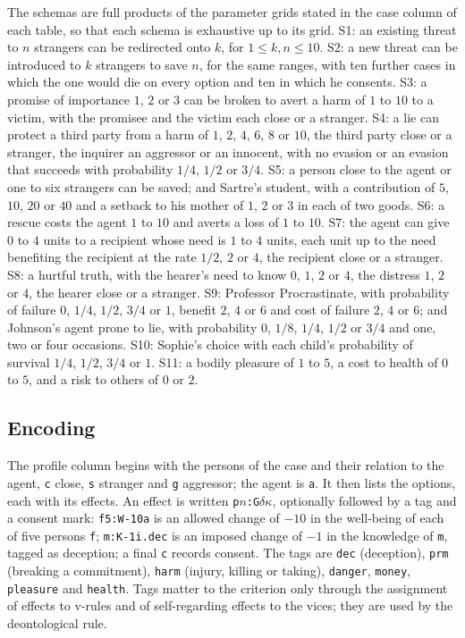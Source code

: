 \documentclass{situationist-preprint}
\begin{document}
The schemas are full products of the parameter grids stated in the case column of each table, so that each schema is exhaustive up to its grid. S1: an existing threat to $n$ strangers can be redirected onto $k$, for $1\leq k,n\leq 10$. S2: a new threat can be introduced to $k$ strangers to save $n$, for the same ranges, with ten further cases in which the one would die on every option and ten in which he consents. S3: a promise of importance $1$, $2$ or $3$ can be broken to avert a harm of $1$ to $10$ to a victim, with the promisee and the victim each close or a stranger. S4: a lie can protect a third party from a harm of $1$, $2$, $4$, $6$, $8$ or $10$, the third party close or a stranger, the inquirer an aggressor or an innocent, with no evasion or an evasion that succeeds with probability $1/4$, $1/2$ or $3/4$. S5: a person close to the agent or one to six strangers can be saved; and Sartre's student, with a contribution of $5$, $10$, $20$ or $40$ and a setback to his mother of $1$, $2$ or $3$ in each of two goods. S6: a rescue costs the agent $1$ to $10$ and averts a loss of $1$ to $10$. S7: the agent can give $0$ to $4$ units to a recipient whose need is $1$ to $4$ units, each unit up to the need benefiting the recipient at the rate $1/2$, $2$ or $4$, the recipient close or a stranger. S8: a hurtful truth, with the hearer's need to know $0$, $1$, $2$ or $4$, the distress $1$, $2$ or $4$, the hearer close or a stranger. S9: Professor Procrastinate, with probability of failure $0$, $1/4$, $1/2$, $3/4$ or $1$, benefit $2$, $4$ or $6$ and cost of failure $2$, $4$ or $6$; and Johnson's agent prone to lie, with probability $0$, $1/8$, $1/4$, $1/2$ or $3/4$ and one, two or four occasions. S10: Sophie's choice with each child's probability of survival $1/4$, $1/2$, $3/4$ or $1$. S11: a bodily pleasure of $1$ to $5$, a cost to health of $0$ to $5$, and a risk to others of $0$ or $2$.

\subsection*{Encoding}

The profile column begins with the persons of the case and their relation to the agent, \texttt{c} close, \texttt{s} stranger and \texttt{g} aggressor; the agent is \texttt{a}. It then lists the options, each with its effects. An effect is written \texttt{p$n$:G$\delta$$\kappa$}, optionally followed by a tag and a consent mark: \texttt{f5:W-10a} is an allowed change of $-10$ in the well-being of each of five persons \texttt{f}; \texttt{m:K-1i.dec} is an imposed change of $-1$ in the knowledge of \texttt{m}, tagged as deception; a final \texttt{c} records consent. The tags are \texttt{dec} (deception), \texttt{prm} (breaking a commitment), \texttt{harm} (injury, killing or taking), \texttt{danger}, \texttt{money}, \texttt{pleasure} and \texttt{health}. Tags matter to the criterion only through the assignment of effects to v-rules and of self-regarding effects to the vices; they are used by the deontological rule.
\end{document}
